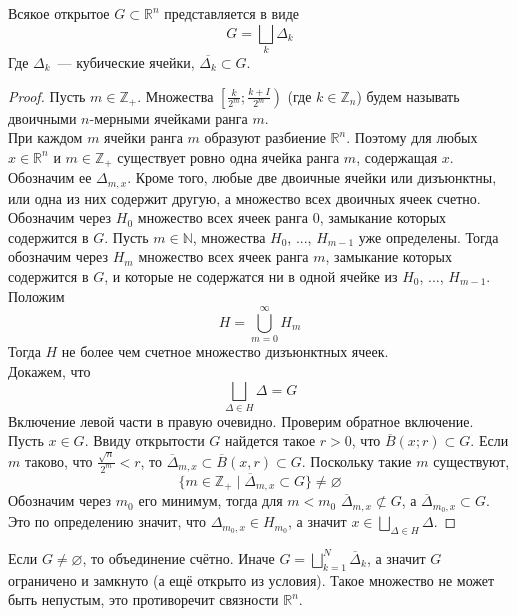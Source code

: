 \documentclass{article}
\begin{document}
    \begin{theorem}
        \label{Представление открытого множества в виде объединения ячеек}
        Всякое открытое $G\subset\mathbb R^n$ представляется в виде
        $$
        G=\bigsqcup_k\Delta_k
        $$
        Где $\Delta_k$~--- кубические ячейки, $\overline{\Delta_k}\subset G$.
    \end{theorem}
    \begin{proof}
        Пусть $m\in\mathbb Z_+$. Множества $\left[\frac k{2^m};\frac{k+I}{2^m}\right)$ (где $k\in\mathbb Z_n$) будем называть двоичными $n$-мерными ячейками ранга $m$.\\
        При каждом $m$ ячейки ранга $m$ образуют разбиение $\mathbb R^n$. Поэтому для любых $x\in \mathbb R^n$ и $m\in\mathbb Z_+$ существует ровно одна ячейка ранга $m$, содержащая $x$. Обозначим ее $\Delta_{m,x}$. Кроме того, любые две двоичные ячейки или дизъюнктны, или одна из них содержит другую, а множество всех двоичных ячеек счетно.\\
        Обозначим через $H_0$ множество всех ячеек ранга 0, замыкание которых содержится в $G$. Пусть $m\in\mathbb N$, множества $H_0$, ..., $H_{m-1}$ уже определены. Тогда обозначим через $H_m$ множество всех ячеек ранга $m$, замыкание которых содержится в $G$, и которые не содержатся ни в одной ячейке из $H_0$, ..., $H_{m-1}$. Положим
        $$H=\bigcup\limits_{m=0}^\infty H_m$$
        Тогда $H$ не более чем счетное множество дизъюнктных ячеек.\\
        Докажем, что
        $$
        \bigsqcup\limits_{\Delta\in H}\Delta=G
        $$
        Включение левой части в правую очевидно. Проверим обратное включение. Пусть $x\in G$. Ввиду открытости $G$ найдется такое $r>0$, что $\overline B(x;r)\subset G$. Если $m$ таково, что $\frac{\sqrt n}{2^m}<r$, то $\overline\Delta_{m,x}\subset\overline B(x,r)\subset G$. Поскольку такие $m$ существуют,
        $$\{m\in\mathbb Z_+\mid\overline\Delta_{m,x}\subset G\}\neq\varnothing$$
        Обозначим через $m_0$ его минимум, тогда для $m<m_0$ $\overline\Delta_{m,x}\not\subset G$, а $\overline\Delta_{m_0,x}\subset G$. Это по определению значит, что $\Delta_{m_0,x}\in H_{m_0}$, а значит $x\in\bigsqcup\limits_{\Delta\in H}\Delta$.
    \end{proof}
    \begin{remark}
        Если $G\neq\varnothing$, то объединение счётно. Иначе $G=\bigsqcup\limits_{k=1}^N\overline\Delta_k$, а значит $G$ ограничено и замкнуто (а ещё открыто из условия). Такое множество не может быть непустым, это противоречит связности $\mathbb R^n$.
    \end{remark}
\end{document}
